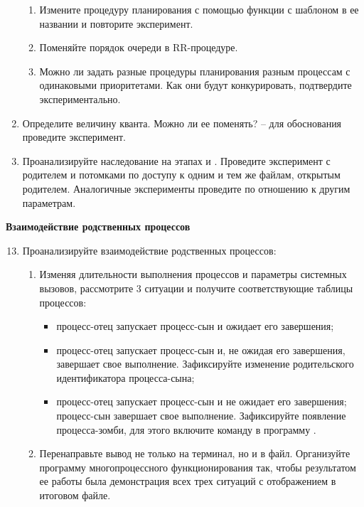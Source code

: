\begin{enumerate}
\begin{enumerate}
			\item Измените процедуру планирования с помощью функции с шаблоном  в ее названии и повторите эксперимент.
			\item Поменяйте порядок очереди в RR-процедуре. 
			\item Можно ли задать разные процедуры планирования разным процессам с одинаковыми приоритетами. Как они будут конкурировать, подтвердите экспериментально.
		\end{enumerate}
	\item  Определите величину кванта. Можно ли ее поменять? – для обоснования проведите эксперимент.
	\item  Проанализируйте наследование на этапах  и . Проведите эксперимент с родителем и потомками по доступу к одним и тем же файлам, открытым родителем. Аналогичные эксперименты проведите по отношению к другим параметрам. 
\end{enumerate}

\textbf{Взаимодействие родственных процессов}

\begin{enumerate}
	\setcounter{enumi}{12}
	\item Проанализируйте взаимодействие родственных процессов:
		\begin{enumerate}
			\item Изменяя длительности выполнения процессов и параметры
			системных вызовов, рассмотрите 3 ситуации и получите соответствующие
			таблицы процессов:
				\begin{itemize}
					\item процесс-отец запускает процесс-сын и ожидает его завершения;
					\item процесс-отец запускает процесс-сын и, не ожидая его завершения,
					завершает свое выполнение. Зафиксируйте изменение родительского
					идентификатора процесса-сына;
					\item процесс-отец запускает процесс-сын и не ожидает его завершения;
					процесс-сын завершает свое выполнение. Зафиксируйте появление
					процесса-зомби, для этого включите команду  в программу .
				\end{itemize}
			\item Перенаправьте вывод не только на терминал, но и в файл.
			Организуйте программу многопроцессного функционирования так, чтобы
			результатом ее работы была демонстрация всех трех ситуаций с
			отображением в итоговом файле.
		\end{enumerate}
\end{enumerate}

